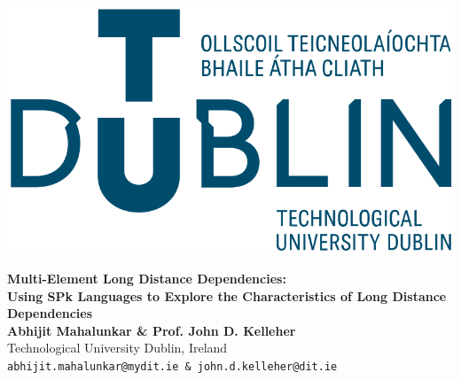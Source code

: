 \documentclass[a0,portrait]{a0poster}
\begin{document}
\begin{minipage}[c]{0.25\linewidth}
\includegraphics[width=16.5cm]{logo.png}\\
\end{minipage}
\begin{minipage}[c]{0.75\linewidth}
\veryHuge \color{tudLogoColor} \textbf{Multi-Element Long Distance Dependencies:}\\ %
\Huge\textbf{Using SPk Languages to Explore the Characteristics of Long Distance Dependencies} \color{Black}\\[1cm] %
\huge{}\textbf{Abhijit Mahalunkar \& Prof. John D. Kelleher}\\[0.5cm]
\huge Technological University Dublin, Ireland\\[0.4cm]
\Large \texttt{abhijit.mahalunkar@mydit.ie \& john.d.kelleher@dit.ie}\\
\end{minipage}


\end{document}
